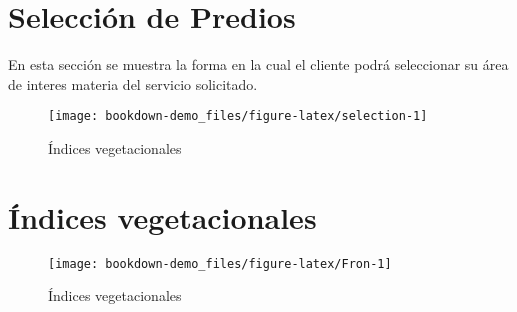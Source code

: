 \documentclass[]{report}
\begin{document}
\hypertarget{SelecPredios}{\chapter{Selección de
Predios}\label{SelecPredios}}

En esta sección se muestra la forma en la cual el cliente podrá
seleccionar su área de interes materia del servicio solicitado.

\begin{figure}

{\centering \texttt{[image: bookdown-demo\_files/figure-latex/selection-1]} 

}

\caption{Índices vegetacionales}\label{fig:selection}
\end{figure}

\hypertarget{indicesVeg}{\chapter{Índices
vegetacionales}\label{indicesVeg}}

\begin{figure}

{\centering \texttt{[image: bookdown-demo\_files/figure-latex/Fron-1]} 

}

\caption{Índices vegetacionales}\label{fig:Fron}
\end{figure}


\end{document}
